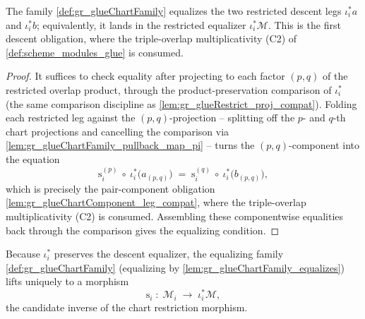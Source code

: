 \begin{lemma}
  \label{lem:gr_glueChartFamily_equalizes}
  The family \cref{def:gr_glueChartFamily} equalizes the two restricted descent legs
  \(\iota_i^{*}a\) and \(\iota_i^{*}b\); equivalently, it lands in the restricted
  equalizer \(\iota_i^{*}\mathcal{M}\). This is the first descent obligation, where the
  triple-overlap multiplicativity (C2) of \cref{def:scheme_modules_glue} is consumed.
\end{lemma}
\begin{proof}
    \leanok
  It suffices to check equality after projecting to each factor \((p,q)\) of the
  restricted overlap product, through the product-preservation comparison of
  \(\iota_i^{*}\) (the same comparison discipline as \cref{lem:gr_glueRestrict_proj_compat}).
  Folding each restricted leg against the \((p,q)\)-projection -- splitting off the
  \(p\)- and \(q\)-th chart projections and cancelling the comparison via
  \cref{lem:gr_glueChartFamily_pullback_map_pi} -- turns the \((p,q)\)-component into the
  equation
  \[
    \mathrm{s}_i^{(p)}\ \circ\ \iota_i^{*}\bigl(a_{(p,q)}\bigr)
      \;=\;
    \mathrm{s}_i^{(q)}\ \circ\ \iota_i^{*}\bigl(b_{(p,q)}\bigr),
  \]
  which is precisely the pair-component obligation
  \cref{lem:gr_glueChartComponent_leg_compat}, where the triple-overlap multiplicativity
  (C2) is consumed. Assembling these componentwise equalities back through the comparison
  gives the equalizing condition.
\end{proof}

\begin{definition}
  \label{def:gr_glueRestrictionInv}
  Because \(\iota_i^{*}\) preserves the descent equalizer, the equalizing family
  \cref{def:gr_glueChartFamily} (equalizing by \cref{lem:gr_glueChartFamily_equalizes})
  lifts uniquely to a morphism
  \[
    \mathrm{s}_i \;:\; \mathcal{M}_i \;\longrightarrow\; \iota_i^{*}\mathcal{M},
  \]
  the candidate inverse of the chart restriction morphism.
\end{definition}

